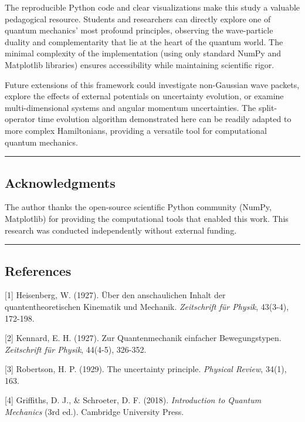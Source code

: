 \documentclass[
]{article}
\begin{document}
The reproducible Python code and clear visualizations make this study a
valuable pedagogical resource. Students and researchers can directly
explore one of quantum mechanics' most profound principles, observing
the wave-particle duality and complementarity that lie at the heart of
the quantum world. The minimal complexity of the implementation (using
only standard NumPy and Matplotlib libraries) ensures accessibility
while maintaining scientific rigor.

Future extensions of this framework could investigate non-Gaussian wave
packets, explore the effects of external potentials on uncertainty
evolution, or examine multi-dimensional systems and angular momentum
uncertainties. The split-operator time evolution algorithm demonstrated
here can be readily adapted to more complex Hamiltonians, providing a
versatile tool for computational quantum mechanics.

\begin{center}\rule{0.5\linewidth}{0.5pt}\end{center}

\subsection{Acknowledgments}\label{acknowledgments}

The author thanks the open-source scientific Python community (NumPy,
Matplotlib) for providing the computational tools that enabled this
work. This research was conducted independently without external
funding.

\begin{center}\rule{0.5\linewidth}{0.5pt}\end{center}

\subsection{References}\label{references}

{[}1{]} Heisenberg, W. (1927). Über den anschaulichen Inhalt der
quantentheoretischen Kinematik und Mechanik. \emph{Zeitschrift für
Physik}, 43(3-4), 172-198.

{[}2{]} Kennard, E. H. (1927). Zur Quantenmechanik einfacher
Bewegungstypen. \emph{Zeitschrift für Physik}, 44(4-5), 326-352.

{[}3{]} Robertson, H. P. (1929). The uncertainty principle.
\emph{Physical Review}, 34(1), 163.

{[}4{]} Griffiths, D. J., \& Schroeter, D. F. (2018). \emph{Introduction
to Quantum Mechanics} (3rd ed.). Cambridge University Press.
\end{document}
